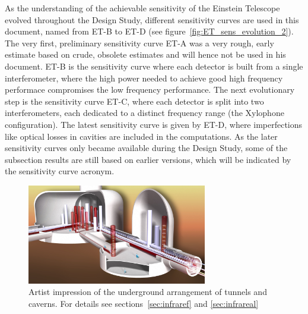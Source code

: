 As the understanding of the achievable sensitivity of the Einstein Telescope evolved throughout the Design Study, different sensitivity curves are used in this document, named from ET-B to ET-D (see figure~\ref{fig:ET_sens_evolution_2}). The very first, preliminary sensitivity curve ET-A was a very rough, early estimate based on crude, obsolete estimates and will hence not be used in  his document. ET-B is the sensitivity curve where each detector is built from a single interferometer, where the high power needed to achieve good high frequency performace compromises the low frequency performance. The next evolutionary step is the sensitivity curve ET-C, where each detector is split into two interferometers, each dedicated to a distinct frequency range (the Xylophone configuration). The latest sensitivity curve is given by ET-D, where imperfections like optical losses in cavities are included in the computations. As the later sensitivity curves only became available during the Design Study, some of the subsection results are still based on earlier versions, which will be indicated by the sensitivity curve acronym.

\begin{figure}
	\centering
		\includegraphics[width=0.7\textwidth]{Sec_SiteInfra/Figures/ArtisticView1.jpg}
	\caption{Artist impression of the underground arrangement of tunnels and caverns. For details see sections~\ref{sec:infraref} and \ref{sec:infrareal}}
	\label{fig:Artisticview1}
\end{figure}

